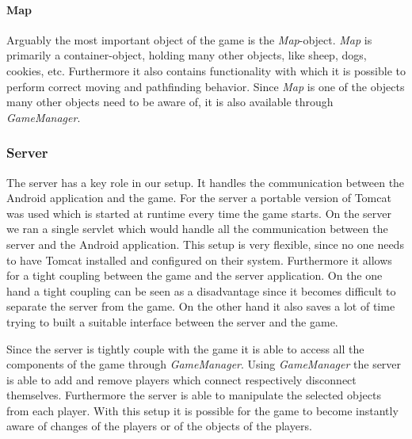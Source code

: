 \documentclass[a4paper,10pt]{report}
\begin{document}
		\paragraph{Map}
		Arguably the most important object of the game is the \emph{Map}-object.
		\emph{Map} is primarily a container-object, holding many other objects, like sheep, dogs, cookies, etc.
		Furthermore it also contains functionality with which it is possible to perform correct moving and pathfinding behavior.
		Since \emph{Map} is one of the objects many other objects need to be aware of, it is also available through \emph{GameManager}.

	\subsubsection{Server}
	The server has a key role in our setup.
	It handles the communication between the Android application and the game.
	For the server a portable version of Tomcat was used which is started at runtime every time the game starts.
	On the server we ran a single servlet which would handle all the communication between the server and the Android application.
	This setup is very flexible, since no one needs to have Tomcat installed and configured on their system.
	Furthermore it allows for a tight coupling between the game and the server application.
	On the one hand a tight coupling can be seen as a disadvantage since it becomes difficult to separate the server from the game.
	On the other hand it also saves a lot of time trying to built a suitable interface between the server and the game.
			
	Since the server is tightly couple with the game it is able to access all the components of the game through \emph{GameManager}.
	Using \emph{GameManager} the server is able to add and remove players which connect respectively disconnect themselves.
	Furthermore the server is able to manipulate the selected objects from each player.
	With this setup it is possible for the game to become instantly aware of changes of the players or of the objects of the players.
	
\end{document}
